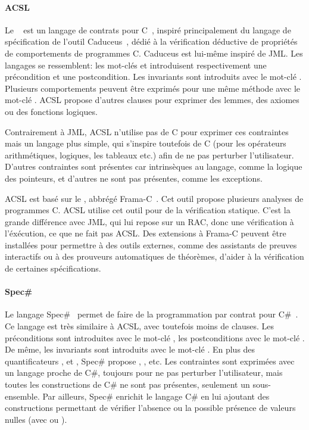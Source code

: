 \paragraph{ACSL} Le ~ est
un langage de contrats pour C~, inspiré principalement du langage de
spécification de l'outil Caduceus~, dédié à la vérification
déductive de propriétés de comportements de programmes C. Caduceus est lui-même
inspiré de JML. Les langages se ressemblent: les mot-clés  et
 introduisent respectivement une précondition et une
postcondition. Les invariants sont introduits avec le mot-clé .
Plusieurs comportements peuvent être exprimés pour une même méthode avec le
mot-clé . ACSL propose d'autres clauses pour exprimer des
lemmes, des axiomes ou des fonctions logiques.

Contrairement à JML, ACSL n'utilise pas de C pour exprimer ces con\-train\-tes
mais un langage plus simple, qui s'inspire toutefois de C (pour les opérateurs
arithmétiques, logiques, les tableaux etc.) afin de ne pas perturber
l'utilisateur. D'autres contraintes sont présentes car intrinsèques au langage,
comme la logique des pointeurs, et d'autres ne sont pas présentes, comme les
exceptions.

ACSL est basé sur le , abbrégé
Frama-C~. Cet outil propose plusieurs analyses de programmes C.
ACSL utilise cet outil pour de la vérification statique. C'est la grande
différence avec JML, qui lui repose sur un RAC, donc une vérification à
l'éxécution, ce que ne fait pas ACSL. Des extensions à Frama-C peuvent être
installées pour permettre à des outils externes, comme des assistants de preuves
interactifs ou à des prouveurs automatiques de théorèmes, d'aider à la
vérification de certaines spécifications.

\paragraph{Spec\#} Le langage Spec\#~ permet de faire de la
programmation par contrat pour C\#~. Ce langage est très similaire
à ACSL, avec toutefois moins de clauses. Les préconditions sont introduites avec
le mot-clé , les postconditions avec le mot-clé .
De même, les invariants sont introduits avec le mot-clé . En
plus des quantificateurs ,  et ,
Spec\# propose , ,  etc. Les contraintes sont
exprimées avec un langage proche de C\#, toujours pour ne pas perturber
l'utilisateur, mais toutes les constructions de C\# ne sont pas présentes,
seulement un sous-ensemble.  Par ailleurs, Spec\# enrichit le langage C\# en lui
ajoutant des constructions permettant de vérifier l'absence ou la possible
présence de valeurs nulles (avec \code{!} ou ).

